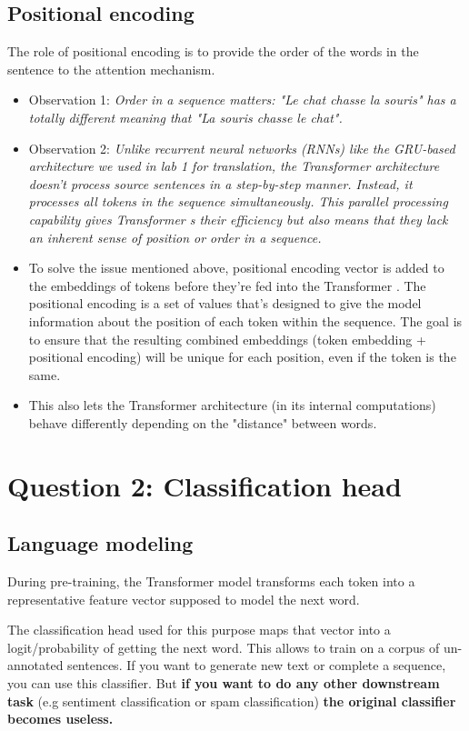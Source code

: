 \documentclass[a4paper]{article}
\begin{document}
\subsection*{Positional encoding}
The role of positional encoding is to provide the order of the words in the sentence to the attention mechanism.
\begin{itemize}
\item Observation 1: \textit{Order in a sequence matters: "Le chat chasse la souris" has a totally different meaning that "La souris chasse le chat".}
\item Observation 2: \textit{Unlike recurrent neural networks (RNNs) like the GRU-based architecture we used in lab 1 for translation, the Transformer \cite{vaswani2017} architecture \cite{vaswani2017}
doesn't process source sentences in a step-by-step manner. Instead, it processes all tokens in the sequence simultaneously.
This parallel processing capability gives Transformer \cite{vaswani2017}s their efficiency but also means that they lack an inherent sense of position or order in a sequence.}
\item To solve the issue mentioned above, positional encoding vector is added to the embeddings of tokens before they're fed into the Transformer \cite{vaswani2017}.
The positional encoding is a set of values that's designed to give the model information about the position of each token within the sequence.
The goal is to ensure that the resulting combined embeddings (token embedding + positional encoding) will be unique for each position, even if the token is the same.
\item This also lets the Transformer \cite{vaswani2017} architecture (in its internal computations) behave differently depending on the "distance" between words.
\end{itemize} 

\section{Question 2: Classification head}
\subsection*{Language modeling}
During pre-training, the Transformer \cite{vaswani2017} model transforms each token into a representative feature vector supposed to model the next word.

The classification head used for this purpose maps that vector into a logit/probability of getting the next word.
This allows to train on a corpus of un-annotated
sentences. If you want to generate new text or complete a sequence, you can use this classifier. \newline
But \textbf{if you want to do any other downstream task} (e.g sentiment classification or spam classification)
\textbf{the original classifier becomes useless.}
\end{document}
